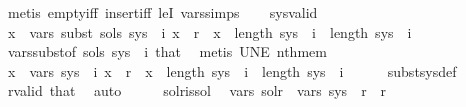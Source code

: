 \begin{isabellebody}
\ {\isacharparenleft}{\kern0pt}metis\ empty{\isacharunderscore}{\kern0pt}iff\ insert{\isacharunderscore}{\kern0pt}iff\ leI\ vars{\isachardot}{\kern0pt}simps{\isacharparenleft}{\kern0pt}{}{\isacharparenright}{\kern0pt}{\isacharparenright}{\kern0pt}\isanewline
\ \ \isamarkupfalse%
\ sys{\isacharunderscore}{\kern0pt}valid\ \isamarkupfalse%
\ {\isachardoublequoteopen}{\isasymforall}x\ {\isasymin}\ vars\ {\isacharparenleft}{\kern0pt}subst\ sols\ {\isacharparenleft}{\kern0pt}sys\ {\isacharbang}{\kern0pt}\ i{\isacharparenright}{\kern0pt}{\isacharparenright}{\kern0pt}{\isachardot}{\kern0pt}\ x\ {\isasymge}\ r\ {\isasymand}\ x\ {\isacharless}{\kern0pt}\ length\ sys{\isachardoublequoteclose}\ \ {\isachardoublequoteopen}i\ {\isacharless}{\kern0pt}\ length\ sys{\isachardoublequoteclose}\ \ i\isanewline
\ \ \ \ \isamarkupfalse%
\ vars{\isacharunderscore}{\kern0pt}subst{\isacharbrackleft}{\kern0pt}of\ sols\ {\isachardoublequoteopen}sys\ {\isacharbang}{\kern0pt}\ i{\isachardoublequoteclose}{\isacharbrackright}{\kern0pt}\ that\ \isamarkupfalse%
\ {\isacharparenleft}{\kern0pt}metis\ UN{\isacharunderscore}{\kern0pt}E\ nth{\isacharunderscore}{\kern0pt}mem{\isacharparenright}{\kern0pt}\isanewline
\ \ \isamarkupfalse%
\ \isamarkupfalse%
\ {\isachardoublequoteopen}{\isasymforall}x\ {\isasymin}\ vars\ {\isacharparenleft}{\kern0pt}sys{\isacharprime}{\kern0pt}\ {\isacharbang}{\kern0pt}\ i{\isacharparenright}{\kern0pt}{\isachardot}{\kern0pt}\ x\ {\isasymge}\ r\ {\isasymand}\ x\ {\isacharless}{\kern0pt}\ length\ sys{\isachardoublequoteclose}\ \ {\isachardoublequoteopen}i\ {\isacharless}{\kern0pt}\ length\ sys{\isachardoublequoteclose}\ \ i\isanewline
\ \ \ \ \isamarkupfalse%
\ subst{\isacharunderscore}{\kern0pt}sys{\isacharunderscore}{\kern0pt}def\ \isamarkupfalse%
\ r{\isacharunderscore}{\kern0pt}valid\ that\ \isamarkupfalse%
\ auto\isanewline
\ \ \isamarkupfalse%
\ \isamarkupfalse%
\ sol{\isacharunderscore}{\kern0pt}r{\isacharunderscore}{\kern0pt}is{\isacharunderscore}{\kern0pt}sol\ \isamarkupfalse%
\ {\isachardoublequoteopen}vars\ {\isacharparenleft}{\kern0pt}sol{\isacharunderscore}{\kern0pt}r{\isacharparenright}{\kern0pt}\ {\isasymsubseteq}\ vars\ {\isacharparenleft}{\kern0pt}sys{\isacharprime}{\kern0pt}\ {\isacharbang}{\kern0pt}\ r{\isacharparenright}{\kern0pt}\ {\isacharminus}{\kern0pt}\ {\isacharbraceleft}{\kern0pt}r{\isacharbraceright}{\kern0pt}{\isachardoublequoteclose}\isanewline

\end{isabellebody}
